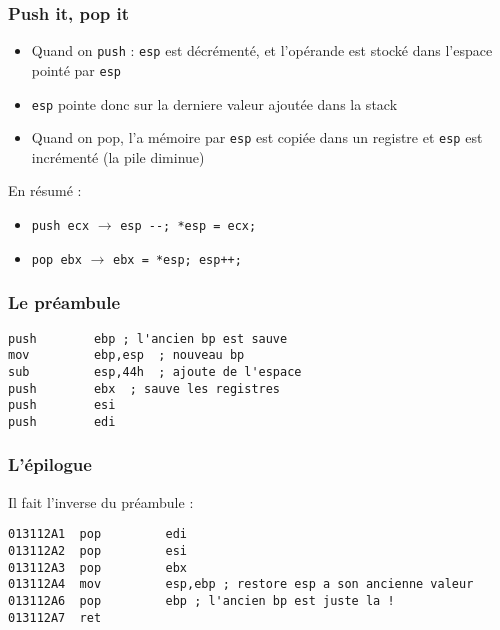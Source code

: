 \documentclass{beamer}
\begin{document}
\begin{frame}[fragile]
\frametitle{Push it, pop it}
\begin{itemize}
\item Quand on \texttt{push} : \texttt{esp} est décrémenté, et l'opérande est stocké dans l'espace pointé par \texttt{esp}
\item \texttt{esp} pointe donc sur la derniere valeur ajoutée dans la stack
\item Quand on pop, l'a mémoire par \texttt{esp} est copiée dans un registre et \texttt{esp} est incrémenté (la pile diminue)
\end{itemize}
\pause
En résumé :
\begin{itemize}
\item  \lstinline[language={[x86masm]Assembler}]+push ecx+ $\rightarrow$ \lstinline+esp --; *esp = ecx;+ 
\item  \lstinline[language={[x86masm]Assembler}]+pop ebx+ $\rightarrow$  \lstinline!ebx = *esp; esp++;!
\end{itemize}
\end{frame}



\begin{frame}[fragile]
\frametitle{Le préambule} 
\begin{lstlisting}[language={[x86masm]Assembler}, basicstyle={\scriptsize\ttfamily}]
push        ebp ; l'ancien bp est sauve
mov         ebp,esp  ; nouveau bp
sub         esp,44h  ; ajoute de l'espace
push        ebx  ; sauve les registres
push        esi  
push        edi  
\end{lstlisting}
\end{frame}

\begin{frame}[fragile]
\frametitle{L'épilogue}
Il fait l'inverse du préambule :
\begin{lstlisting}[language={[x86masm]Assembler}, basicstyle={\scriptsize\ttfamily}]
013112A1  pop         edi
013112A2  pop         esi
013112A3  pop         ebx
013112A4  mov         esp,ebp ; restore esp a son ancienne valeur
013112A6  pop         ebp ; l'ancien bp est juste la !
013112A7  ret
\end{lstlisting}
\end{frame}
\end{document}
